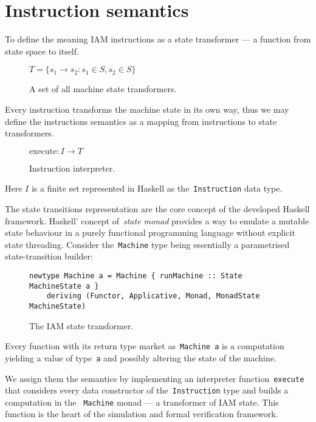 \section{Instruction semantics}

To define the meaning IAM instructions as a state transformer --- a function from
state space to itself.

\begin{figure}[H]
\centering
$T = \{s_1 \rightarrow s_2 : s_1 \in S, s_2 \in S\}$
\label{}
\caption{A set of all machine state transformers.}
\end{figure}

Every instruction transforms the machine state in its own
way, thus we may define the instructions semantics as a mapping from instructions
to state transformers.

\begin{figure}[H]
\centering
$ \textrm{execute}:I \rightarrow T$
\label{}
\caption{Instruction interpreter.}
\end{figure}

Here $I$ is a finite set represented in Haskell as
the~\texttt{Instruction} data type.

The state transitions representation are the core concept of the developed
Haskell framework. Haskell' concept of~\emph{state monad} provides a way to
emulate a mutable state behaviour in a purely functional programming language
without explicit state threading. Consider the~\texttt{Machine} type being
essentially a parametrised state-transition builder:

\begin{figure}[H]
\begin{verbatim}
newtype Machine a = Machine { runMachine :: State MachineState a }
    deriving (Functor, Applicative, Monad, MonadState MachineState)
\end{verbatim}
\caption{The IAM state transformer.}
\end{figure}

Every function with its return type market as~\texttt{Machine a} is a computation
yielding a value of type~\texttt{a} and possibly altering the state of the machine.

We assign them the semantics by implementing an interpreter
function~\texttt{execute} that considers every data constructor of
the~\texttt{Instruction} type and builds a computation in the
~\texttt{Machine} monad --- a transformer of IAM state. This function
is the heart of the simulation and formal verification framework.

